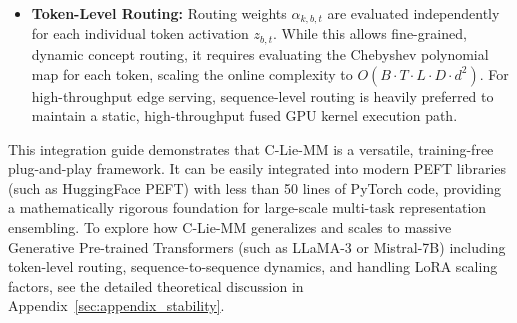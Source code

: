 \begin{itemize}
    The merged projection basis $Y_{\text{merged}, b}$ is evaluated exactly once per sequence. The forward pass projection $z_{b, t, \text{projected}} = Y_{\text{merged}, b} (Y_{\text{merged}, b}^T z_{b, t})$ is then applied to all $T$ tokens via standard, hardware-accelerated GEMM matrix multiplications. This decouples the exponential map evaluation from the sequence length, achieving $O(B \cdot L \cdot D \cdot d^2)$ complexity and zero additional token-level overhead during long-context autoregressive generation (e.g., in massive LLMs like LLaMA-3).
    \item \textbf{Token-Level Routing:} Routing weights $\alpha_{k, b, t}$ are evaluated independently for each individual token activation $z_{b, t}$. While this allows fine-grained, dynamic concept routing, it requires evaluating the Chebyshev polynomial map for each token, scaling the online complexity to $O(B \cdot T \cdot L \cdot D \cdot d^2)$. For high-throughput edge serving, sequence-level routing is heavily preferred to maintain a static, high-throughput fused GPU kernel execution path.
\end{itemize}

This integration guide demonstrates that C-Lie-MM is a versatile, training-free plug-and-play framework. It can be easily integrated into modern PEFT libraries (such as HuggingFace PEFT) with less than 50 lines of PyTorch code, providing a mathematically rigorous foundation for large-scale multi-task representation ensembling. To explore how C-Lie-MM generalizes and scales to massive Generative Pre-trained Transformers (such as LLaMA-3 or Mistral-7B) including token-level routing, sequence-to-sequence dynamics, and handling LoRA scaling factors, see the detailed theoretical discussion in Appendix~\ref{sec:appendix_stability}.


